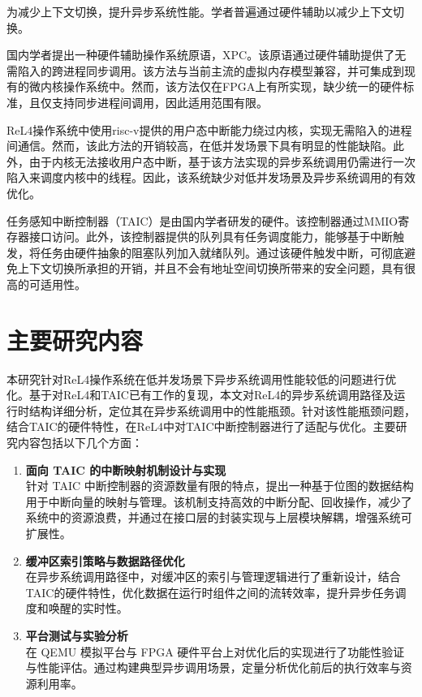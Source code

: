 为减少上下文切换，提升异步系统性能。学者普遍通过硬件辅助以减少上下文切换。

国内学者提出一种硬件辅助操作系统原语，XPC\cite{XPC2019}。该原语通过硬件辅助提供了无需陷入的跨进程同步调用。该方法与当前主流的虚拟内存模型兼容，并可集成到现有的微内核操作系统中。然而，该方法仅在FPGA上有所实现，缺少统一的硬件标准，且仅支持同步进程间调用，因此适用范围有限。

ReL4操作系统中使用risc-v提供的用户态中断能力绕过内核，实现无需陷入的进程间通信。然而，该此方法的开销较高，在低并发场景下具有明显的性能缺陷。此外，由于内核无法接收用户态中断，基于该方法实现的异步系统调用仍需进行一次陷入来调度内核中的线程。因此，该系统缺少对低并发场景及异步系统调用的有效优化。

任务感知中断控制器（TAIC）\cite{taic2024}是由国内学者研发的硬件。该控制器通过MMIO寄存器接口访问。此外，该控制器提供的队列具有任务调度能力，能够基于中断触发，将任务由硬件抽象的阻塞队列加入就绪队列。通过该硬件触发中断，可彻底避免上下文切换所承担的开销，并且不会有地址空间切换所带来的安全问题，具有很高的可适用性。

\section{主要研究内容}

本研究针对ReL4操作系统在低并发场景下异步系统调用性能较低的问题进行优化。基于对ReL4和TAIC已有工作的复现，本文对ReL4的异步系统调用路径及运行时结构详细分析，定位其在异步系统调用中的性能瓶颈。针对该性能瓶颈问题，结合TAIC的硬件特性，在ReL4中对TAIC中断控制器进行了适配与优化。主要研究内容包括以下几个方面：

\begin{enumerate}

  \item \textbf{面向 TAIC 的中断映射机制设计与实现} \\
  针对 TAIC 中断控制器的资源数量有限的特点，提出一种基于位图的数据结构用于中断向量的映射与管理。该机制支持高效的中断分配、回收操作，减少了系统中的资源浪费，并通过在接口层的封装实现与上层模块解耦，增强系统可扩展性。

  \item \textbf{缓冲区索引策略与数据路径优化} \\
  在异步系统调用路径中，对缓冲区的索引与管理逻辑进行了重新设计，结合TAIC的硬件特性，优化数据在运行时组件之间的流转效率，提升异步任务调度和唤醒的实时性。

  \item \textbf{平台测试与实验分析} \\
  在 QEMU 模拟平台与 FPGA 硬件平台上对优化后的实现进行了功能性验证与性能评估。通过构建典型异步调用场景，定量分析优化前后的执行效率与资源利用率。


\end{enumerate}


